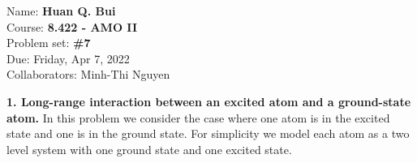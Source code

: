 \documentclass{article}
\theoremstyle{definition}
\begin{document}
\begin{framed}
\noindent Name: \textbf{Huan Q. Bui}\\
Course: \textbf{8.422 - AMO II}\\
Problem set: \textbf{\#7}\\
Due: Friday, Apr 7, 2022\\
Collaborators:  Minh-Thi Nguyen
\end{framed}
	




\noindent \textbf{1. Long-range interaction between an excited atom and a ground-state atom.} In this problem we consider the case where one atom is in the excited state and one is in the ground state. For simplicity we model each atom as a two level system with one ground state and one excited state. 
\end{document}
